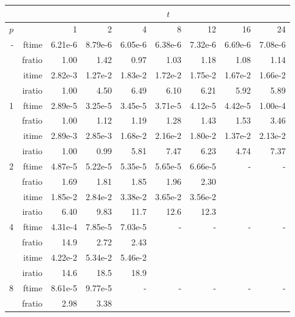 \documentclass[a4]{article}
\begin{document}
\begin{table}
\begin{center}
\begin{tabular}{|r|r|r|r|r|r|r|r|r|}
\hline 
     &  & \multicolumn{7}{c|}{$t$} \\ \hline
    $p$  &  & 1           & 2    & 4    & 8    & 12   & 16    & 24  \\ \hline\hline
    -  & ftime &  6.21e-6 &   8.79e-6 &   6.05e-6 &   6.38e-6 &   7.32e-6 &   6.69e-6 &   7.08e-6    \\ 
      & fratio &  1.00 &    1.42 &    0.97 &   1.03 &    1.18 &    1.08 &    1.14     \\ 
     & itime &    2.82e-3 &   1.27e-2 &   1.83e-2 &   1.72e-2 &   1.75e-2 &   1.67e-2 &   1.66e-2    \\ 
     & iratio &  1.00 &    4.50 &    6.49 &    6.10 &    6.21 &    5.92 &    5.89      \\ \hline \hline
    1  & ftime &  2.89e-5 &   3.25e-5 &   3.45e-5 &   3.71e-5 &   4.12e-5 &   4.42e-5 &   1.00e-4    \\ 
      & fratio &  1.00 &    1.12 &    1.19 &    1.28 &    1.43 &    1.53 &    3.46     \\ 
     & itime &  2.89e-3 &   2.85e-3 &   1.68e-2 &   2.16e-2 &   1.80e-2 &   1.37e-2 &   2.13e-2      \\ 
     & iratio &  1.00 &    0.99 &   5.81 &    7.47 &    6.23 &    4.74 &    7.37      \\ \hline
    2  & ftime &   4.87e-5 &   5.22e-5 &   5.35e-5 &   5.65e-5 &   6.66e-5 &    - & - \\ 
      & fratio &  1.69 &    1.81 &    1.85 &    1.96 &    2.30 &       &  \\
      & itime &   1.85e-2 &   2.84e-2 &   3.38e-2 &   3.65e-2 &   3.56e-2 &      &  \\
      & iratio &  6.40 &    9.83 &    11.7 &   12.6 &   12.3 &     &  \\ \hline
    4  & ftime &  4.31e-4 &   7.85e-5 &   7.03e-5 &    - & - & - & - \\ 
      & fratio &  14.9 &   2.72 &    2.43 &       &  &  &  \\
      & itime &     4.22e-2 &   5.34e-2 &   5.46e-2 &     & & & \\
      & iratio &    14.6 &   18.5 &   18.9 &    & & &  \\ \hline
    8  & ftime &  8.61e-5 &   9.77e-5 &       - & - & - & - & - \\ 
      & fratio &   2.98 &    3.38 &        &  &  &  &  \\

\end{tabular}
\end{center}
\end{table}
\end{document}
